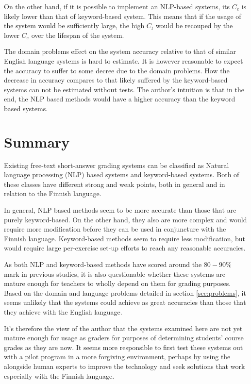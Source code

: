 \documentclass[english]{tktltiki2}
\theoremstyle{definition}
\theoremstyle{remark}
\begin{document}
On the other hand, if it is possible to implement an NLP-based systems, its $C_e$ is likely lower than that of keyword-based system. This means that if the usage of the system would be sufficiently large, the high $C_t$ would be recouped by the lower $C_e$ over the lifespan of the system.

The domain problems effect on the system accuracy relative to that of similar English language systems is hard to estimate. It is however reasonable to expect the accuracy to suffer to some decree due to the domain problems. How the decrease in accuracy compares to that likely suffered by the keyword-based systems can not be estimated without tests. The author's intuition is that in the end, the NLP based methods would have a higher accuracy than the keyword based systems.

\section{Summary}

Existing free-text short-answer grading systems can be classified as Natural language processing (NLP) based systems and keyword-based systems. Both of these classes have different strong and weak points, both in general and in relation to the Finnish language.

In general, NLP based methods seem to be more accurate than those that are purely keyword-based. On the other hand, they also are more complex and would require more modification before they can be used in conjuncture with the Finnish language. Keyword-based methods seem to require less modification, but would require large per-exercise set-up efforts to reach any reasonable accuracies. 

As both NLP and keyword-based methods have scored around the $80-90\%$ mark in previous studies, it is also questionable whether these systems are mature enough for teachers to wholly depend on them for grading purposes. Based on the domain and language problems detailed in section \ref{sec:problems}, it seems unlikely that the systems could achieve as great accuracies than those that they achieve with the English language.

It's therefore the view of the author that the systems examined here are not yet mature enough for usage as graders for purposes of determining students' course grades as they are now. It seems more responsible to first test these systems out with a pilot program in a more forgiving environment, perhaps by using the alongside human experts to improve the technology and seek solutions that work especially with the Finnish language. 
\end{document}
